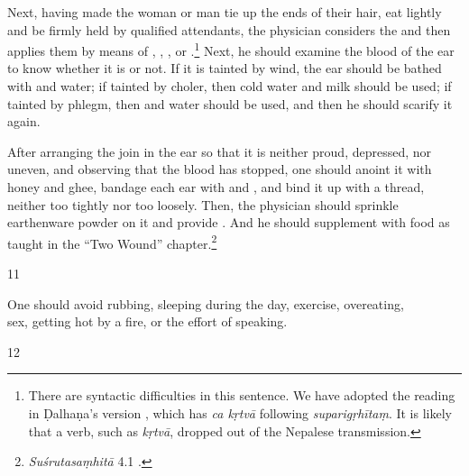 \begin{translation}
Next, having made the woman or man tie up the ends of their hair, eat lightly and
be firmly held by qualified attendants, the physician considers the
 and then applies them by means of ,
, , or
.\footnote{There are syntactic difficulties in this
    sentence.  We have %
    adopted the reading in Ḍalhaṇa's version \citep[78]{vulgate}, which has
    \emph{ca kṛtvā} following \emph{suparigṛhītaṃ}. It is likely that a verb, such
    as \emph{kṛtvā}, dropped out of the Nepalese transmission.}  Next, he should
    examine the blood of the ear to know whether it is  or not.
    If it is tainted by wind, the ear should be bathed with
     and water; if tainted by choler, then
    cold water and milk should be used; if tainted by phlegm, then
     and water should be used, and then he should
    scarify it again.
       
After arranging the join in the ear so that it is neither proud, depressed, nor
uneven, and observing that the blood has stopped, one should anoint it with
honey and ghee, bandage each ear with  and , and
bind it up with a thread, neither too tightly nor too loosely.  Then, the
physician should sprinkle earthenware powder on it and  provide
. And he should supplement with food as taught in  the
“Two Wound” chapter.\footnote{\emph{Suśrutasaṃhitā} 4.1 \citep[396–408]{vulgate}.}
    
\item[11]
\begin{sloka}
        One should avoid rubbing, sleeping during the day, exercise, overeating,\\
        sex, getting hot by a fire, or the effort of speaking.
    \end{sloka}

\item[12]
    

\end{translation}
